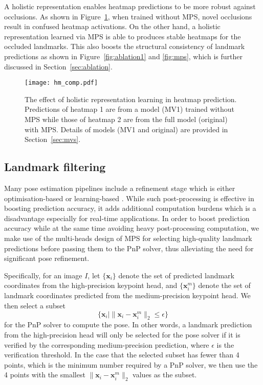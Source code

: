 \documentclass[10pt,twocolumn,letterpaper]{article}
\newcommand{\bx}{\bm{x}}
\begin{document}
A holistic representation enables heatmap predictions to be more robust against occlusions. As shown in Figure~\ref{fig:hm_comp}, when trained without MPS, novel occlusions result in confused heatmap activations. On the other hand, a holistic representation learned via MPS is able to produces stable heatmaps for the occluded landmarks. This also boosts the structural consistency of landmark predictions as shown in Figure~\ref{fig:ablation1} and \ref{fig:mps}, which is further discussed in Section~\ref{sec:ablation}.



\begin{figure}[t]
    \centering
    \texttt{[image: hm\_comp.pdf]}
    \caption{The effect of holistic representation learning in heatmap prediction. Predictions of heatmap 1 are from a model (MV1) trained without MPS while those of heatmap 2 are from the full model (original) with MPS. Details of models (MV1 and original) are provided in Section~\ref{sec:mvs}. }
    \label{fig:hm_comp}
\end{figure}

\subsection{Landmark filtering}
Many pose estimation pipelines include a refinement stage which is either optimisation-based \cite{Kehl2017ssd, Chen2019satellite, song2020hybridpose} or learning-based \cite{rad2017bb8, li2020deepim, labbe2020cosypose, Zakharov2019dpod}. While such post-processing is effective in boosting prediction accuracy, it adds additional computation burdens which is a disadvantage especially for real-time applications. In order to boost prediction accuracy while at the same time avoiding heavy post-processing computation, we make use of the multi-heads design of MPS for selecting high-quality landmark predictions before passing them to the PnP solver, thus alleviating the need for significant pose refinement. 

Specifically, for an image $I$, let $\{\bx_i\}$ denote the set of predicted landmark coordinates from the high-precision keypoint head, and $\{\bx_i^m\}$ denote the set of landmark coordinates predicted from the medium-precision keypoint head. We then select a subset
\begin{equation}
    \{\bx_i | \rVert \bx_i - \bx_i^m \rVert_2 \leq \epsilon \}
\end{equation}
for the PnP solver to compute the pose. In other words, a landmark prediction from the high-precision head will only be selected for the pose solver if it is verified by the corresponding medium-precision prediction, where $\epsilon$ is the verification threshold. In the case that the selected subset has fewer than 4 points, which is the minimum number required by a PnP solver, we then use the 4 points with the smallest $\rVert \bx_i - \bx_i^m \rVert_2$ values as the subset. 
\end{document}
